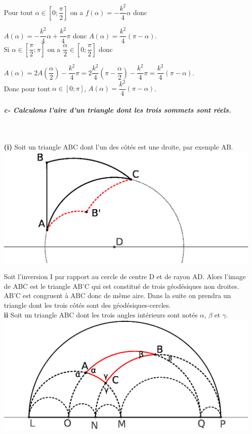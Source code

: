 \documentclass[a4paper, 12pt, twoside]{book}
\begin{document}
   Pour tout $\alpha\in [0; \dfrac{\pi}{2}]$  on a $f(\alpha)=-\dfrac{k^{2}}{4}\alpha$ donc\
   
   $A(\alpha)=-\dfrac{k^{2}}{4}\alpha+\dfrac{k^{2}}{4}\pi$ donc $A(\alpha)=\dfrac{k^{2}}{4}(\pi-\alpha)$.\\
   
   Si $\alpha\in [\dfrac{\pi}{2}; \pi]$ on a $\dfrac{\alpha}{2}\in [0;\dfrac{\pi}{2}]$ donc \
   
    $A(\alpha)=2A(\dfrac{\alpha}{2})-\dfrac{k^{2}}{4}\pi=2\dfrac{k^{2}}{4}(\pi-\dfrac{\alpha}{2})-\dfrac{k^{2}}{4}\pi=\dfrac{k^{2}}{4}(\pi-\alpha)$.\\
    
    Donc pour tout $\alpha\in [0; \pi]$, $A(\alpha)=\dfrac{k^{2}}{4}(\pi-\alpha)$.\\
    
    
 \subparagraph{c- Calculons l'aire d'un triangle dont les trois sommets sont réels.}\
 
 \textbf{(i)} Soit un triangle ABC dont l'un des côtés est une droite, par exemple AB.\\
 
  \includegraphics[scale=0.7]{figures/hyper26.eps}
  
  Soit l'inversion I par rapport au cercle de centre D et de rayon AD. Alors l'image de ABC est le triangle AB'C qui est constitué de trois géodésiques non droites. AB'C est congruent à ABC donc de même aire. Dans la suite on prendra un triangle dont les trois côtés sont des géodésiques-cercles.\\
  
  \textbf{ii} Soit un triangle ABC dont les trois angles intérieurs sont notés $\alpha$, $\beta$ et $\gamma$.\\
  
   \includegraphics[scale=0.7]{figures/hyper22.eps}\\
   
\end{document}
